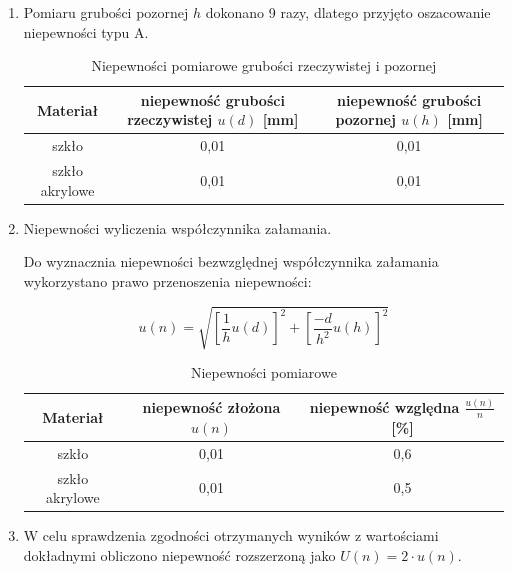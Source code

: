 \documentclass [a4paper,11pt]{article}
\begin{document}
\begin{enumerate}[label=\alph*)]
		\item Pomiaru grubości pozornej $h$ dokonano 9 razy, dlatego przyjęto oszacowanie niepewności typu A.
		
		\begin{table}[!h]
			\caption{Niepewności pomiarowe grubości rzeczywistej i pozornej}
			\label{tab:niephd}
			\begin{center}
				\begin{tabular}{|c|c|c|}
					\hline Materiał & niepewność grubości rzeczywistej $u(d)$ [mm] & niepewność grubości pozornej $u(h)$ [mm] \\
					\hline szkło & 0,01 & 0,01 \\
					\hline szkło akrylowe & 0,01 & 0,01 \\
					\hline 
				\end{tabular} 
			\end{center}
		\end{table}
		
		\item Niepewności wyliczenia współczynnika załamania.
		
		Do wyznacznia niepewności bezwzględnej współczynnika załamania wykorzystano prawo przenoszenia niepewności:
		
		\begin{equation}
		\label{eq:niepewnosczlozona}
		u(n) = \sqrt{\left[ \frac{1}{h}u(d) \right]^2 + \left[ \frac{-d}{h^2}u(h) \right]^2}
		\end{equation}
		\begin{table}[!h]
			\caption{Niepewności pomiarowe}
			\label{tab:niepewnosci}
			\begin{center}
				\begin{tabular}{|c|c|c|}
					\hline Materiał & niepewność złożona $u(n)$ & niepewność względna $\frac{u(n)}{n}$ [\%] \\
					\hline szkło & 0,01 & 0,6 \\
					\hline szkło akrylowe & 0,01 & 0,5 \\
					\hline 
				\end{tabular} 
			\end{center}
		\end{table}
		
		\item W celu sprawdzenia zgodności otrzymanych wyników z wartościami dokładnymi obliczono niepewność
		rozszerzoną jako $U(n) = 2 \cdot u(n)$.
		
		~
		
		~
	\end{enumerate}
	
\end{document}
